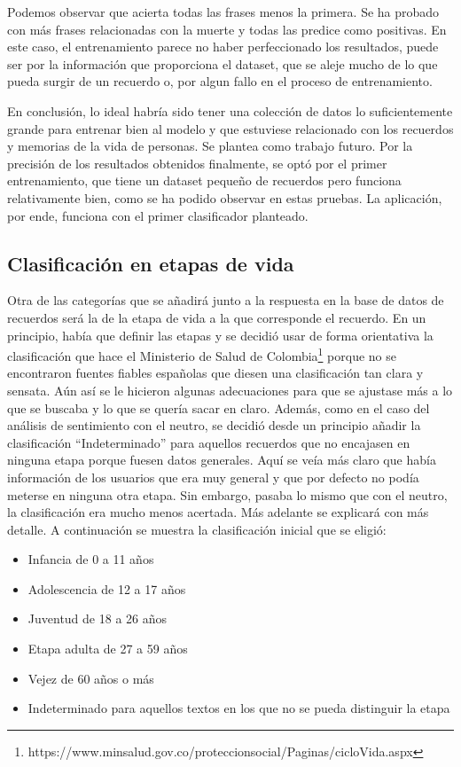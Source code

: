 Podemos observar que acierta todas las frases menos la primera. Se ha probado con más frases relacionadas con la muerte y todas las predice como positivas. En este caso, el entrenamiento parece no haber perfeccionado los resultados, puede ser por la información que proporciona el dataset, que se aleje mucho de lo que pueda surgir de un recuerdo o, por algun fallo en el proceso de entrenamiento. 

En conclusión, lo ideal habría sido tener una colección de datos lo suficientemente grande para entrenar bien al modelo y que estuviese relacionado con los recuerdos y memorias de la vida de personas. Se plantea como trabajo futuro. Por la precisión de los resultados obtenidos finalmente, se optó por el primer entrenamiento, que tiene un dataset pequeño de recuerdos pero funciona relativamente bien, como se ha podido observar en estas pruebas. La aplicación, por ende, funciona con el primer clasificador planteado. 

\subsection{Clasificación en etapas de vida} \label{clasificacion_etapasvida}

Otra de las categorías que se añadirá junto a la respuesta en la base de datos de recuerdos será la de la etapa de vida a la que corresponde el recuerdo. En un principio, había que definir las etapas y se decidió usar de forma orientativa la clasificación que hace el Ministerio de Salud de Colombia\footnote{https://www.minsalud.gov.co/proteccionsocial/Paginas/cicloVida.aspx} porque no se encontraron fuentes fiables españolas que diesen una clasificación tan clara y sensata. Aún así se le hicieron algunas adecuaciones para que se ajustase más a lo que se buscaba y lo que se quería sacar en claro. Además, como en el caso del análisis de sentimiento con el neutro, se decidió desde un principio añadir la clasificación ``Indeterminado'' para aquellos recuerdos que no encajasen en ninguna etapa porque fuesen datos generales. Aquí se veía más claro que había información de los usuarios que era muy general y que por defecto no podía meterse en ninguna otra etapa. Sin embargo, pasaba lo mismo que con el neutro, la clasificación era mucho menos acertada. Más adelante se explicará con más detalle. A continuación se muestra la clasificación inicial que se eligió:

\begin{itemize}
	\item Infancia de 0 a 11 años
	\item Adolescencia de 12 a 17 años
	\item Juventud de 18 a 26 años
	\item Etapa adulta de 27 a 59 años
	\item Vejez de 60 años o más
	\item Indeterminado para aquellos textos en los que no se pueda distinguir la etapa
\end{itemize}

